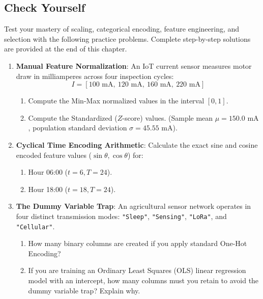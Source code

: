 \subsection{Check Yourself}\label{subsec:feature_check_yourself}

Test your mastery of scaling, categorical encoding, feature engineering, and selection with the following practice problems. Complete step-by-step solutions are provided at the end of this chapter.

\begin{checkyourself}
\begin{enumerate}
    \item \textbf{Manual Feature Normalization}:
    An IoT current sensor measures motor draw in milliamperes across four inspection cycles:
    \begin{equation*}
    I = [100\text{ mA}, \ 120\text{ mA}, \ 160\text{ mA}, \ 220\text{ mA}]
    \end{equation*}
    \begin{enumerate}[label=(\alph*)]
        \item Compute the Min-Max normalized values in the interval $[0, 1]$.
        \item Compute the Standardized ($Z$-score) values. (Sample mean $\mu = 150.0\text{ mA}$, population standard deviation $\sigma = 45.55\text{ mA}$).
    \end{enumerate}

    \item \textbf{Cyclical Time Encoding Arithmetic}:
    Calculate the exact sine and cosine encoded feature values ($\sin\theta, \cos\theta$) for:
    \begin{enumerate}[label=(\alph*)]
        \item Hour 06:00 ($t = 6, T = 24$).
        \item Hour 18:00 ($t = 18, T = 24$).
    \end{enumerate}

    \item \textbf{The Dummy Variable Trap}:
    An agricultural sensor network operates in four distinct transmission modes: \texttt{"Sleep"}, \texttt{"Sensing"}, \texttt{"LoRa"}, and \texttt{"Cellular"}.
    \begin{enumerate}[label=(\alph*)]
        \item How many binary columns are created if you apply standard One-Hot Encoding?
        \item If you are training an Ordinary Least Squares (OLS) linear regression model with an intercept, how many columns must you retain to avoid the dummy variable trap? Explain why.
    \end{enumerate}


\end{enumerate}
\end{checkyourself}
